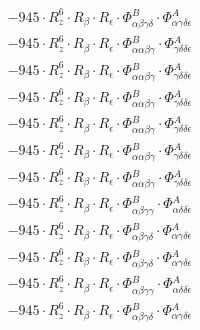 \documentclass{article}
\begin{document}
\begin{subequations}
\begin{gather}
\begin{array}{c}
 \\[0.2em] 		 - 945 \cdot R_{z}^{6} \cdot R_{\beta{}} \cdot R_{\epsilon{}} \cdot \Phi{}^{B}_{\alpha{}\beta{}\gamma{}\delta{}} \cdot \Phi{}^{A}_{\alpha{}\gamma{}\delta{}\epsilon{}} 
 \\[0.2em] 		 - 945 \cdot R_{z}^{6} \cdot R_{\beta{}} \cdot R_{\epsilon{}} \cdot \Phi{}^{B}_{\alpha{}\alpha{}\beta{}\gamma{}} \cdot \Phi{}^{A}_{\gamma{}\delta{}\delta{}\epsilon{}} 
 \\[0.2em] 		 - 945 \cdot R_{z}^{6} \cdot R_{\beta{}} \cdot R_{\epsilon{}} \cdot \Phi{}^{B}_{\alpha{}\alpha{}\beta{}\gamma{}} \cdot \Phi{}^{A}_{\gamma{}\delta{}\delta{}\epsilon{}} 
 \\[0.2em] 		 - 945 \cdot R_{z}^{6} \cdot R_{\beta{}} \cdot R_{\epsilon{}} \cdot \Phi{}^{B}_{\alpha{}\alpha{}\beta{}\gamma{}} \cdot \Phi{}^{A}_{\gamma{}\delta{}\delta{}\epsilon{}} 
 \\[0.2em] 		 - 945 \cdot R_{z}^{6} \cdot R_{\beta{}} \cdot R_{\epsilon{}} \cdot \Phi{}^{B}_{\alpha{}\alpha{}\beta{}\gamma{}} \cdot \Phi{}^{A}_{\gamma{}\delta{}\delta{}\epsilon{}} 
 \\[0.2em] 		 - 945 \cdot R_{z}^{6} \cdot R_{\beta{}} \cdot R_{\epsilon{}} \cdot \Phi{}^{B}_{\alpha{}\alpha{}\beta{}\gamma{}} \cdot \Phi{}^{A}_{\gamma{}\delta{}\delta{}\epsilon{}} 
 \\[0.2em] 		 - 945 \cdot R_{z}^{6} \cdot R_{\beta{}} \cdot R_{\epsilon{}} \cdot \Phi{}^{B}_{\alpha{}\alpha{}\beta{}\gamma{}} \cdot \Phi{}^{A}_{\gamma{}\delta{}\delta{}\epsilon{}} 
 \\[0.2em] 		 - 945 \cdot R_{z}^{6} \cdot R_{\beta{}} \cdot R_{\epsilon{}} \cdot \Phi{}^{B}_{\alpha{}\beta{}\gamma{}\gamma{}} \cdot \Phi{}^{A}_{\alpha{}\delta{}\delta{}\epsilon{}} 
 \\[0.2em] 		 - 945 \cdot R_{z}^{6} \cdot R_{\beta{}} \cdot R_{\epsilon{}} \cdot \Phi{}^{B}_{\alpha{}\beta{}\gamma{}\delta{}} \cdot \Phi{}^{A}_{\alpha{}\gamma{}\delta{}\epsilon{}} 
 \\[0.2em] 		 - 945 \cdot R_{z}^{6} \cdot R_{\beta{}} \cdot R_{\epsilon{}} \cdot \Phi{}^{B}_{\alpha{}\beta{}\gamma{}\delta{}} \cdot \Phi{}^{A}_{\alpha{}\gamma{}\delta{}\epsilon{}} 
 \\[0.2em] 		 - 945 \cdot R_{z}^{6} \cdot R_{\beta{}} \cdot R_{\epsilon{}} \cdot \Phi{}^{B}_{\alpha{}\beta{}\gamma{}\gamma{}} \cdot \Phi{}^{A}_{\alpha{}\delta{}\delta{}\epsilon{}} 
 \\[0.2em] 		 - 945 \cdot R_{z}^{6} \cdot R_{\beta{}} \cdot R_{\epsilon{}} \cdot \Phi{}^{B}_{\alpha{}\beta{}\gamma{}\delta{}} \cdot \Phi{}^{A}_{\alpha{}\gamma{}\delta{}\epsilon{}} 

\end{array}
\end{gather}
\end{subequations}
\end{document}
